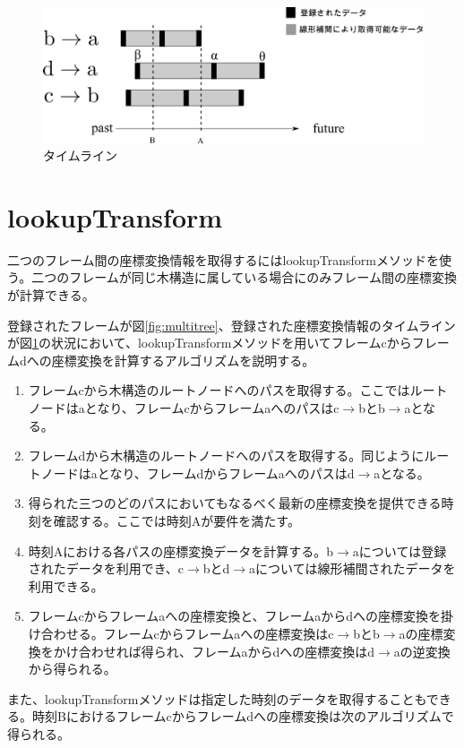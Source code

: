 \documentclass[a4paper]{jreport}	%
\begin{document}
\begin{figure}[h] 
\centering
\includegraphics[width=15cm]{general-timeline.png}
\caption{タイムライン}
\label{fig:general-timeline}
\end{figure}


\section{lookupTransform}
二つのフレーム間の座標変換情報を取得するにはlookupTransformメソッドを使う。二つのフレームが同じ木構造に属している場合にのみフレーム間の座標変換が計算できる。


登録されたフレームが図\ref{fig:multitree}、登録された座標変換情報のタイムラインが図\ref{fig:general-timeline}の状況において、lookupTransformメソッドを用いてフレームcからフレームdへの座標変換を計算するアルゴリズムを説明する。

\begin{enumerate}
	\item フレームcから木構造のルートノードへのパスを取得する。ここではルートノードはaとなり、フレームcからフレームaへのパスはc$\rightarrow$bとb$\rightarrow$aとなる。
	\item フレームdから木構造のルートノードへのパスを取得する。同じようにルートノードはaとなり、フレームdからフレームaへのパスはd$\rightarrow$aとなる。
	\item 得られた三つのどのパスにおいてもなるべく最新の座標変換を提供できる時刻を確認する。ここでは時刻Aが要件を満たす。
	\item 時刻Aにおける各パスの座標変換データを計算する。b$\rightarrow$aについては登録されたデータを利用でき、c$\rightarrow$bとd$\rightarrow$aについては線形補間されたデータを利用できる。
	\item フレームcからフレームaへの座標変換と、フレームaからdへの座標変換を掛け合わせる。フレームcからフレームaへの座標変換はc$\rightarrow$bとb$\rightarrow$aの座標変換をかけ合わせれば得られ、フレームaからdへの座標変換はd$\rightarrow$aの逆変換から得られる。
\end{enumerate}
また、lookupTransformメソッドは指定した時刻のデータを取得することもできる。時刻Bにおけるフレームcからフレームdへの座標変換は次のアルゴリズムで得られる。
\end{document}
